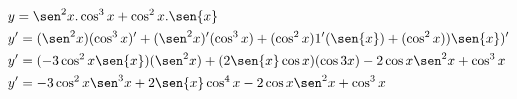 \begin{ex}
\begin{align}
&y=\sen^2{x}.\cos^3{x}+\cos^2{x}.\sen{x}\nonumber\\
&y'=(\sen^2{x})(\cos^3{x})'+(\sen^2{x})'(\cos^3{x})+(\cos^2{x})1'(\sen{x})+(\cos^2{x}))\sen{x})'\nonumber\\
&y'=(-3\cos^2{x}\sen{x})(\sen^2{x})+(2\sen{x}\cos{x})(\cos{3x})-2\cos{x}\sen^2{x}+\cos^3{x}\nonumber\\
&y'=-3\cos^2{x}\sen^3{x}+2\sen{x}\cos^4{x}-2\cos{x}\sen^2{x}+\cos^3{x}\nonumber
\end{align}
\end{ex}